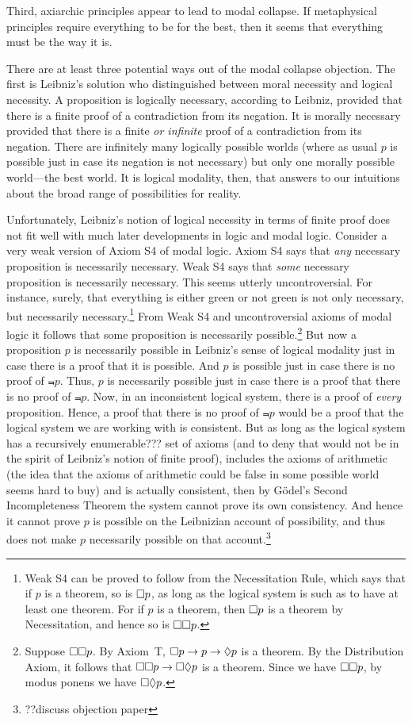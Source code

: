 Third, axiarchic principles appear to lead to modal collapse. If metaphysical principles require everything to be 
for the best, then it seems that everything must be the way it is. 

There are at least three potential ways out of the modal collapse objection. The first is Leibniz's solution who distinguished between 
moral necessity and logical necessity. A proposition is logically necessary, according to Leibniz, provided that there is a finite
proof of a contradiction from its negation. It is morally necessary provided that there is a finite \textit{or infinite} proof of a 
contradiction from its negation. There are infinitely many logically possible worlds (where as usual $p$ is possible just in case its negation
is not necessary) but only one morally possible world---the best world. It is logical modality, then, that answers to our intuitions about
the broad range of possibilities for reality.

Unfortunately, Leibniz's notion of logical necessity in terms of finite proof does not fit well with much later developments in logic and modal logic.
Consider a very weak version of Axiom S4 of modal logic. Axiom S4 says that \textit{any} necessary proposition is necessarily necessary.
Weak S4 says that \textit{some} necessary proposition is necessarily necessary. This seems utterly uncontroversial. For instance, surely, that 
everything is either green or not green is not only necessary, but necessarily necessary.\footnote{Weak S4 can be proved to follow from 
the Necessitation Rule, which says that if $p$ is a theorem, so is $\Box p$, as long as the logical system is such as to have at least one theorem.
For if $p$ is a theorem, then $\Box p$ is a theorem by Necessitation, and hence so is $\Box\Box p$.} From Weak S4 and uncontroversial axioms
of modal logic it follows that some proposition is necessarily possible.\footnote{Suppose $\Box\Box p$. By Axiom~T, $\Box p \rightarrow p \rightarrow \Diamond p$
is a theorem. By the Distribution Axiom, it follows that $\Box\Box p \rightarrow \Box\Diamond p$ is a theorem. Since we have $\Box\Box p$, by
modus ponens we have $\Box\Diamond p$.} But now a proposition $p$ is necessarily possible in Leibniz's sense of logical modality just in case 
there is a proof that it is possible. And $p$ is possible just in case there is no proof of $\Not p$. Thus, $p$ is necessarily possible
just in case there is a proof that there is no proof of $\Not p$. Now, in an inconsistent logical system, there is a proof of \textit{every}
proposition. Hence, a proof that there is no proof of $\Not p$ would be a proof that the logical system we are working with is consistent.
But as long as the logical system has a recursively enumerable??? set of axioms (and to deny that would not be in the spirit of Leibniz's
notion of finite proof), includes the axioms of arithmetic (the idea that the axioms of arithmetic could be false in some possible world
seems hard to buy) and is actually consistent, then by G\"odel's Second Incompleteness Theorem the system cannot prove its own consistency.
And hence it cannot prove $p$ is possible on the Leibnizian account of possibility, and thus does not make $p$ necessarily possible on that
account.\footnote{??discuss objection paper}

